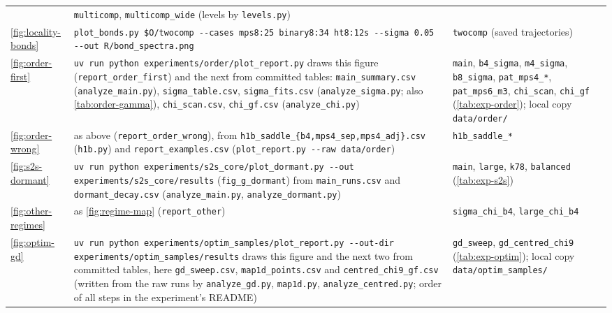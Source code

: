 \begin{xltabular}{\textwidth}{@{}l>{\raggedright\arraybackslash}p{6.4cm}>{\raggedright\arraybackslash}X@{}}
      & \texttt{multicomp}, \texttt{multicomp\_wide} (levels by \texttt{levels.py}) \\
    \ref{fig:locality-bonds} & \texttt{plot\_bonds.py \$O/twocomp -{}-cases mps8:25 binary8:34 ht8:12s
      -{}-sigma 0.05 -{}-out R/bond\_spectra.png}
      & \texttt{twocomp} (saved trajectories) \\
    \ref{fig:order-first} & \texttt{uv run python experiments/order/\allowbreak plot\_report.py} draws this
      figure (\texttt{report\_order\_first}) and the next from committed tables: \texttt{main\_summary.csv}
      (\texttt{analyze\_main.py}), \texttt{sigma\_table.csv}, \texttt{sigma\_fits.csv} (\texttt{analyze\_sigma.py};
      also \cref{tab:order-gamma}), \texttt{chi\_scan.csv}, \texttt{chi\_gf.csv} (\texttt{analyze\_chi.py})
      & \texttt{main}, \texttt{b4\_sigma}, \texttt{m4\_sigma}, \texttt{b8\_sigma}, \texttt{pat\_mps4\_*},
      \texttt{pat\_mps6\_m3}, \texttt{chi\_scan}, \texttt{chi\_gf} (\cref{tab:exp-order}); local copy \texttt{data/order/} \\
    \ref{fig:order-wrong} & as above (\texttt{report\_order\_wrong}), from \texttt{h1b\_saddle\_\{b4,mps4\_sep,mps4\_adj\}.csv}
      (\texttt{h1b.py}) and \texttt{report\_examples.csv} (\texttt{plot\_report.py -{}-raw data/order})
      & \texttt{h1b\_saddle\_*} \\
    \ref{fig:s2s-dormant} & \texttt{uv run python experiments/s2s\_core/\allowbreak plot\_dormant.py -{}-out
      experiments/s2s\_core/results} (\texttt{fig\_g\_dormant}) from \texttt{main\_runs.csv} and
      \texttt{dormant\_decay.csv} (\texttt{analyze\_main.py}, \texttt{analyze\_dormant.py})
      & \texttt{main}, \texttt{large}, \texttt{k78}, \texttt{balanced} (\cref{tab:exp-s2s}) \\
    \ref{fig:other-regimes} & as \cref{fig:regime-map} (\texttt{report\_other}) & \texttt{sigma\_chi\_b4},
      \texttt{large\_chi\_b4} \\
    \ref{fig:optim-gd} & \texttt{uv run python experiments/optim\_samples/\allowbreak plot\_report.py
      -{}-out-dir experiments/optim\_samples/\allowbreak results} draws this figure and the next two from
      committed tables, here
      \texttt{gd\_sweep.csv}, \texttt{map1d\_points.csv} and \texttt{centred\_chi9\_gf.csv} (written from the raw
      runs by \texttt{analyze\_gd.py}, \texttt{map1d.py}, \texttt{analyze\_centred.py}; order of all steps in the
      experiment's README)
      & \texttt{gd\_sweep}, \texttt{gd\_centred\_chi9} (\cref{tab:exp-optim}); local copy
      \texttt{data/optim\_samples/} \\

\end{xltabular}
